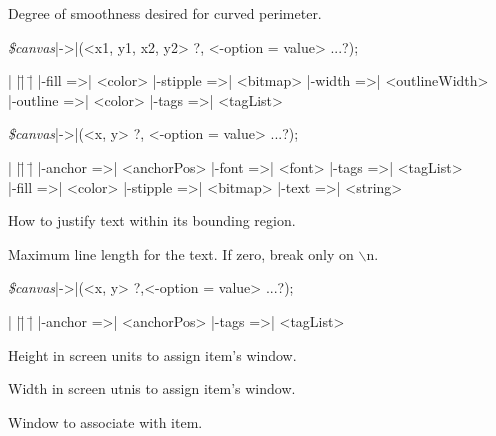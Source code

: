 \begin{enum}{1cm}

Degree of smoothness desired for curved perimeter.

\end{enum}
\vskip5pt

{\samepage
{\it \$canvas}|->|(<x1, y1, x2, y2> ?, <-option =\> value> ...?);
\begin{tabbing}
|                |\=|                   |\= \kill
|-fill =>| <color>        \> |-stipple =>| <bitmap> \> |-width =>| <outlineWidth> \\
|-outline =>| <color>     \> |-tags =>| <tagList>   \>  \\
\end{tabbing}
}

{\samepage
{\it \$canvas}|->|(<x, y> ?, <-option =\> value> ...?);
\begin{tabbing}
|                   |\=|                |\= \kill
|-anchor =>| <anchorPos>  \> |-font =>| <font>      \> |-tags =>| <tagList> \\
|-fill =>| <color>        \> |-stipple =>| <bitmap> \> |-text =>| <string> \\
\end{tabbing}
}
\vspace{-10pt}

\begin{enum}{1cm}

How to justify text within its bounding region.

Maximum line length for the text. If zero, break only on $\backslash$n.

\end{enum}
\vskip5pt

{\samepage
{\it \$canvas}|->|(<x, y> ?,<-option =\> value> ...?);
\begin{tabbing}
|                   |\=|                |\= \kill
|-anchor =>| <anchorPos>  \> |-tags =>| <tagList> \\
\end{tabbing}
}
\vspace{-10pt}

\begin{enum}{4cm}

Height in screen units to assign item's window.

Width in screen utnis to assign item's window.

Window to associate with item.

\end{enum}

